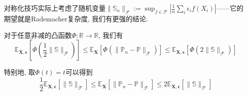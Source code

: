对称化技巧实际上考虑了随机变量$\|\mathbb{S}_n\|_{\mathscr{F}} := \sup_{f \in \mathscr{F}} \left| \frac{1}{n} \sum_i \epsilon_i f(X_i) \right|$——它的期望就是Rademacher复杂度, 我们有更强的结论. 
\begin{proposition}
	对于任意非减的凸函数$\Phi \colon \mathbb{R} \to \mathbb{R}$, 我们有
	\begin{equation*}
		\mathbb{E}_{\bm{X}, \bm{\epsilon}} \left[ \Phi\left(\frac{1}{2} \|\mathbb{S}\|_{\bar{\mathscr{F}}} \right)\right]
		\leq \mathbb{E}_{\bm{X}} \left[ \Phi\left(\|\mathbb{P}_n - \mathbb{P}\|_{\mathscr{F}}\right)\right]
		\leq \mathbb{E}_{\bm{X}, \bm{\epsilon}} \left[ \Phi\left(2 \|\mathbb{S}\|_{\mathscr{F}} \right)\right]
	\end{equation*}	
\end{proposition}
\begin{remark}
	特别地, 取$\Phi(t) = t$可以得到
	\begin{equation}\label{eq:SandwichedByRC}
		\frac{1}{2} \mathbb{E}_{\bm{X}, \bm{\epsilon}} \left[\|\mathbb{S}\|_{\bar{\mathscr{F}}}\right] 
		\leq \mathbb{E}_{\bm{X}} \left[ \|\mathbb{P}_n - \mathbb{P}\|_{\mathscr{F}} \right] 
		\leq 2 \mathbb{E}_{\bm{X}, \bm{\epsilon}} \left[ \|\mathbb{S}\|_{\mathscr{F}} \right] 
	\end{equation}
\end{remark}
